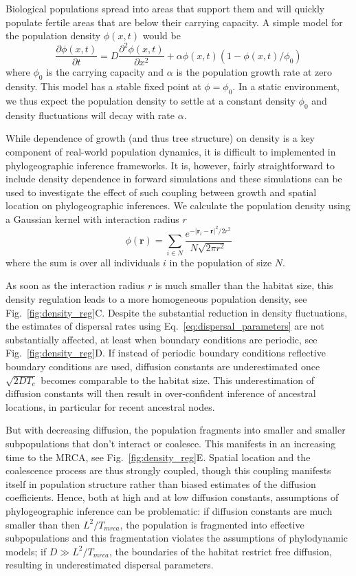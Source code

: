 \documentclass[aps,rmp, twocolumn]{revtex4}
\newcommand{\rvec}{\mathbf{r}}
\begin{document}
Biological populations spread into areas that support them and will quickly populate fertile areas that are below their carrying capacity.
A simple model for the population density $\phi(x,t)$ would be
\begin{equation}
    \label{eq:FKPP}
    \frac{\partial \phi(x,t)}{\partial t} = D\frac{\partial^2 \phi(x,t)}{\partial x^2} + \alpha \phi(x,t)(1-\phi(x,t)/\phi_0)
\end{equation}
where $\phi_0$ is the carrying capacity and $\alpha$ is the population growth rate at zero density.
This model has a stable fixed point at $\phi=\phi_0$.
In a static environment, we thus expect the population density to settle at a constant density $\phi_0$ and density fluctuations will decay with rate $\alpha$.

While dependence of growth (and thus tree structure) on density is a key component of real-world population dynamics, it is difficult to implemented in phylogeographic inference frameworks.
It is, however, fairly straightforward to include density dependence in forward simulations and these simulations can be used to investigate the effect of such coupling between growth and spatial location on phylogeographic inferences.
We calculate the population density using a Gaussian kernel with interaction radius $r$
\begin{equation}
    \phi(\rvec) = \sum_{i\in N} \frac{e^{-|\rvec_i - \rvec|^2/2r^2}}{N\sqrt{2\pi r^2}}
\end{equation}
where the sum is over all individuals $i$ in the population of size $N$.

As soon as the interaction radius $r$ is much smaller than the habitat size, this density regulation leads to a more homogeneous population density, see Fig.~\ref{fig:density_reg}C.
Despite the substantial reduction in density fluctuations, the estimates of dispersal rates using Eq.~\ref{eq:dispersal_parameters} are not substantially affected, at least when boundary conditions are periodic, see Fig.~\ref{fig:density_reg}D.
If instead of periodic boundary conditions reflective boundary conditions are used, diffusion constants are underestimated once $\sqrt{2DT_c}$ becomes comparable to the habitat size.
This underestimation of diffusion constants will then result in over-confident inference of ancestral locations, in particular for recent ancestral nodes.

But with decreasing diffusion, the population fragments into smaller and smaller subpopulations that don't interact or coalesce.
This manifests in an increasing time to the MRCA, see Fig.~\ref{fig:density_reg}E.
Spatial location and the coalescence process are thus strongly coupled, though this coupling manifests itself in population structure rather than biased estimates of the diffusion coefficients.
Hence, both at high and at low diffusion constants, assumptions of phylogeographic inference can be problematic: if diffusion constants are much smaller than then $L^2/T_{mrca}$, the population is fragmented into effective subpopulations and this fragmentation violates the assumptions of phylodynamic models; if $D\gg L^2/T_{mrca}$, the boundaries of the habitat restrict free diffusion, resulting in underestimated dispersal parameters.
\end{document}
